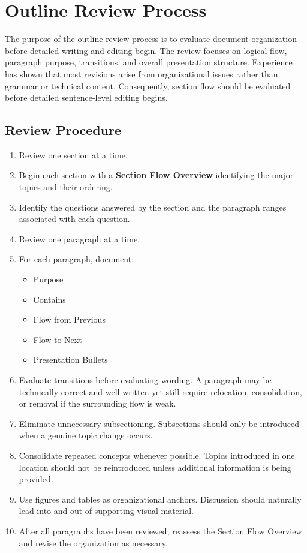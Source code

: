 \section{Outline Review Process}

The purpose of the outline review process is to evaluate document
organization before detailed writing and editing begin. The review
focuses on logical flow, paragraph purpose, transitions, and overall
presentation structure. Experience has shown that most revisions arise
from organizational issues rather than grammar or technical content.
Consequently, section flow should be evaluated before detailed
sentence-level editing begins.

\subsection{Review Procedure}

\begin{enumerate}
\item Review one section at a time.

\item Begin each section with a \textbf{Section Flow Overview}
identifying the major topics and their ordering.

\item Identify the questions answered by the section and the paragraph
ranges associated with each question.

\item Review one paragraph at a time.

\item For each paragraph, document:
\begin{itemize}
\item Purpose
\item Contains
\item Flow from Previous
\item Flow to Next
\item Presentation Bullets
\end{itemize}

\item Evaluate transitions before evaluating wording. A paragraph may
be technically correct and well written yet still require relocation,
consolidation, or removal if the surrounding flow is weak.

\item Eliminate unnecessary subsectioning. Subsections should only be
introduced when a genuine topic change occurs.

\item Consolidate repeated concepts whenever possible. Topics
introduced in one location should not be reintroduced unless additional
information is being provided.

\item Use figures and tables as organizational anchors. Discussion
should naturally lead into and out of supporting visual material.

\item After all paragraphs have been reviewed, reassess the Section
Flow Overview and revise the organization as necessary.
\end{enumerate}

